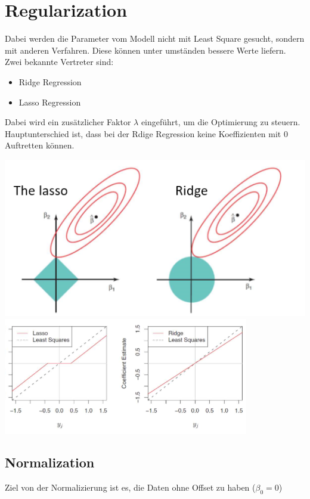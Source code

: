 \section{Regularization}
 Dabei werden die Parameter vom Modell nicht mit Least Square gesucht, sondern mit anderen Verfahren. Diese können unter umständen bessere Werte liefern. Zwei bekannte Vertreter sind:
\begin{itemize}
	\item Ridge Regression
	\item Lasso Regression
\end{itemize}

Dabei wird ein zusätzlicher Faktor $\lambda$ eingeführt, um die Optimierung zu steuern. Hauptunterschied ist, dass bei der Rdige Regression keine Koeffizienten mit 0 Auftretten können.
\begin{center}
	\includegraphics[width=0.5\columnwidth]{./Images/lasse}
	\includegraphics[width=0.5\columnwidth]{./Images/lasse_2}
\end{center}

\subsection{Normalization}
Ziel von der Normalizierung ist es, die Daten ohne Offset zu haben ($\beta_0 = 0$)